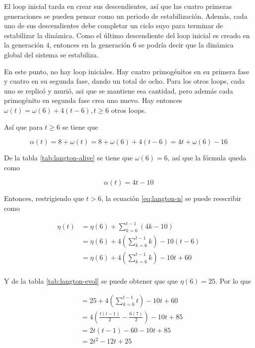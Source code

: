 \documentclass{article}
\begin{document}
El loop inicial tarda en crear sus descendientes, así que las cuatro primeras
generaciones se pueden pensar como un periodo de estabilización. Además, cada
uno de sus descendientes debe completar un ciclo suyo para terminar de
estabilizar la dinámica. Como el último descendiente del loop inicial es creado
en la generación $4$, entonces en la generación $6$ se podría decir que la
dinámica global del sistema se estabiliza.

En este punto, no hay loop iniciales. Hay cuatro primogénitos en su primera fase
y cuatro en su segunda fase, dando un total de ocho. Para los
otros loops, cada uno se replicó y murió, asi que se mantiene esa cantidad, pero
además cada primogénito en segunda fase crea uno nuevo. Hay entonces
$\omega(t) = \omega(6) + 4(t-6), t \ge 6$ otros loops.

Así que para $t \ge 6$ se tiene que

\begin{equation*}
  \alpha(t) = 8 + \omega(t) = 8 + \omega(6) + 4(t-6) = 4t + \omega(6) - 16
\end{equation*}

De la tabla \ref{tab:langton-alive} se tiene que $\omega(6) = 6$, así que la
fórmula queda como

\begin{equation}
\label{eq:langton-a}
  \alpha(t) = 4t - 10
\end{equation}

Entonces, restrigiendo que $t > 6$, la ecuación \ref{eq:langton-n} se puede
reescribir como

\begin{align*}
  \eta(t) &= \eta(6) + \sum_{k = 6}^{t-1}{(4k - 10)}\\
  &= \eta(6) + 4 (\sum_{k=6}^{t-1}{k}) - 10(t-6)\\
  &= \eta(6) + 4 (\sum_{k=6}^{t-1}{k}) - 10t + 60\\
\end{align*}

Y de la tabla \ref{tab:langton-evol} se puede obtener que que $\eta(6) = 25$.
Por lo que

\begin{align*}
  &= 25 + 4 (\sum_{k=6}^{t-1}{t}) - 10t + 60\\
  &= 4 (\frac{t(t-1)}{2} - \frac{6(7)}{2}) - 10t + 85\\
  &= 2t(t-1) - 60 - 10t + 85 \\
  &= 2t^{2} - 12t + 25\\
\end{align*}
\end{document}
